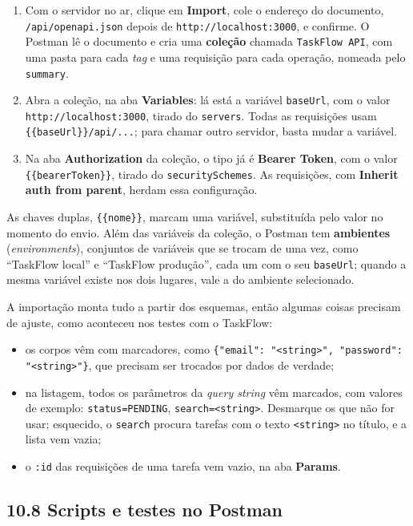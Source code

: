 \begin{enumerate}
  \item Com o servidor no ar, clique em \textbf{Import}, cole o endereço do documento, \texttt{/api/openapi.json} depois de \texttt{http://localhost:3000}, e confirme. O Postman lê o documento e cria uma \textbf{coleção} chamada \texttt{TaskFlow API}, com uma pasta para cada \textit{tag} e uma requisição para cada operação, nomeada pelo \texttt{summary}.
  \item Abra a coleção, na aba \textbf{Variables}: lá está a variável \texttt{baseUrl}, com o valor \texttt{http://localhost:3000}, tirado do \texttt{servers}. Todas as requisições usam \texttt{\{\{baseUrl\}\}/api/...}; para chamar outro servidor, basta mudar a variável.
  \item Na aba \textbf{Authorization} da coleção, o tipo já é \textbf{Bearer Token}, com o valor \texttt{\{\{bearerToken\}\}}, tirado do \texttt{securitySchemes}. As requisições, com \textbf{Inherit auth from parent}, herdam essa configuração.
\end{enumerate}

As chaves duplas, \texttt{\{\{nome\}\}}, marcam uma variável, substituída pelo valor no momento do envio. Além das variáveis da coleção, o Postman tem \textbf{ambientes} (\textit{environments}), conjuntos de variáveis que se trocam de uma vez, como ``TaskFlow local'' e ``TaskFlow produção'', cada um com o seu \texttt{baseUrl}; quando a mesma variável existe nos dois lugares, vale a do ambiente selecionado.

A importação monta tudo a partir dos esquemas, então algumas coisas precisam de ajuste, como aconteceu nos testes com o TaskFlow:

\begin{itemize}
  \item os corpos vêm com marcadores, como \texttt{\{"email": "<string>", "password": "<string>"\}}, que precisam ser trocados por dados de verdade;
  \item na listagem, todos os parâmetros da \textit{query string} vêm marcados, com valores de exemplo: \texttt{status=PENDING}, \texttt{search=<string>}. Desmarque os que não for usar; esquecido, o \texttt{search} procura tarefas com o texto \texttt{<string>} no título, e a lista vem vazia;
  \item o \texttt{:id} das requisições de uma tarefa vem vazio, na aba \textbf{Params}.
\end{itemize}

\subsection{10.8 Scripts e testes no Postman}

